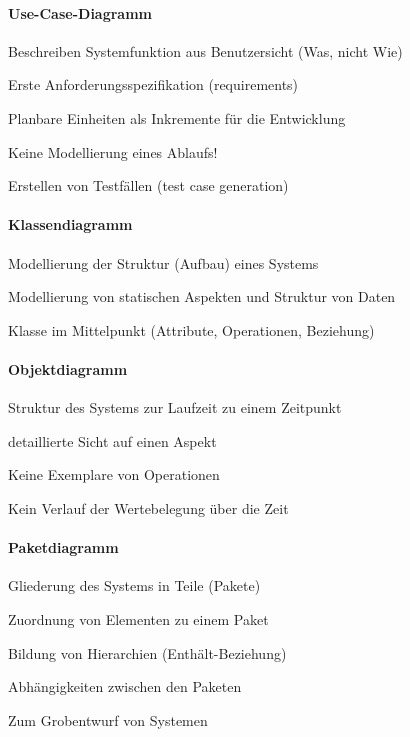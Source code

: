 \documentclass[a4paper]{article}
\begin{document}
\begin{multicols}{3}
  \paragraph{Use-Case-Diagramm}
  \begin{itemize*}
    \item Beschreiben Systemfunktion aus Benutzersicht (Was, nicht Wie)
    \item Erste Anforderungsspezifikation (requirements)
    \item Planbare Einheiten als Inkremente für die Entwicklung
    \item Keine Modellierung eines Ablaufs!
    \item Erstellen von Testfällen (test case generation)
  \end{itemize*}

  \paragraph{Klassendiagramm}
  \begin{itemize*}
    \item Modellierung der Struktur (Aufbau) eines Systems
    \item Modellierung von statischen Aspekten und Struktur von Daten
    \item Klasse im Mittelpunkt (Attribute, Operationen, Beziehung)
  \end{itemize*}

  \paragraph{Objektdiagramm}
  \begin{itemize*}
    \item Struktur des Systems zur Laufzeit zu einem Zeitpunkt
    \item detaillierte Sicht auf einen Aspekt
    \item Keine Exemplare von Operationen
    \item Kein Verlauf der Wertebelegung über die Zeit
  \end{itemize*}

  \paragraph{Paketdiagramm}
  \begin{itemize*}
    \item Gliederung des Systems in Teile (Pakete)
    \item Zuordnung von Elementen zu einem Paket
    \item Bildung von Hierarchien (Enthält-Beziehung)
    \item Abhängigkeiten zwischen den Paketen
    \item Zum Grobentwurf von Systemen
  \end{itemize*}


\end{multicols}
\end{document}
